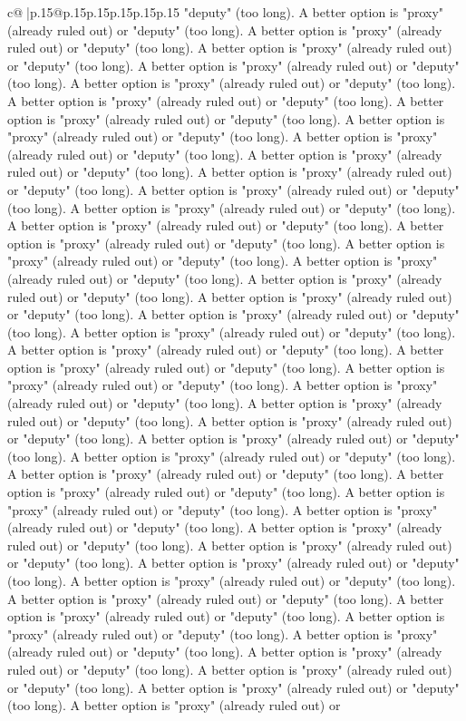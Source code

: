 \documentclass{article}
\begin{document}
{\begin{supertabular}{c@{$\;$}|p{.15\linewidth}@{}p{.15\linewidth}p{.15\linewidth}p{.15\linewidth}p{.15\linewidth}p{.15\linewidth}}
{{{"deputy" (too long). A better option is "proxy" (already ruled out) or "deputy" (too long). A better option is "proxy" (already ruled out) or "deputy" (too long). A better option is "proxy" (already ruled out) or "deputy" (too long). A better option is "proxy" (already ruled out) or "deputy" (too long). A better option is "proxy" (already ruled out) or "deputy" (too long). A better option is "proxy" (already ruled out) or "deputy" (too long). A better option is "proxy" (already ruled out) or "deputy" (too long). A better option is "proxy" (already ruled out) or "deputy" (too long). A better option is "proxy" (already ruled out) or "deputy" (too long). A better option is "proxy" (already ruled out) or "deputy" (too long). A better option is "proxy" (already ruled out) or "deputy" (too long). A better option is "proxy" (already ruled out) or "deputy" (too long). A better option is "proxy" (already ruled out) or "deputy" (too long). A better option is "proxy" (already ruled out) or "deputy" (too long). A better option is "proxy" (already ruled out) or "deputy" (too long). A better option is "proxy" (already ruled out) or "deputy" (too long). A better option is "proxy" (already ruled out) or "deputy" (too long). A better option is "proxy" (already ruled out) or "deputy" (too long). A better option is "proxy" (already ruled out) or "deputy" (too long). A better option is "proxy" (already ruled out) or "deputy" (too long). A better option is "proxy" (already ruled out) or "deputy" (too long). A better option is "proxy" (already ruled out) or "deputy" (too long). A better option is "proxy" (already ruled out) or "deputy" (too long). A better option is "proxy" (already ruled out) or "deputy" (too long). A better option is "proxy" (already ruled out) or "deputy" (too long). A better option is "proxy" (already ruled out) or "deputy" (too long). A better option is "proxy" (already ruled out) or "deputy" (too long). A better option is "proxy" (already ruled out) or "deputy" (too long). A better option is "proxy" (already ruled out) or "deputy" (too long). A better option is "proxy" (already ruled out) or "deputy" (too long). A better option is "proxy" (already ruled out) or "deputy" (too long). A better option is "proxy" (already ruled out) or "deputy" (too long). A better option is "proxy" (already ruled out) or "deputy" (too long). A better option is "proxy" (already ruled out) or "deputy" (too long). A better option is "proxy" (already ruled out) or "deputy" (too long). A better option is "proxy" (already ruled out) or "deputy" (too long). A better option is "proxy" (already ruled out) or "deputy" (too long). A better option is "proxy" (already ruled out) or "deputy" (too long). A better option is "proxy" (already ruled out) or "deputy" (too long). A better option is "proxy" (already ruled out) or "deputy" (too long). A better option is "proxy" (already ruled out) or "deputy" (too long). A better option is "proxy" (already ruled out) or "deputy" (too long). A better option is "proxy" (already ruled out) or "deputy" (too long). A better option is "proxy" (already ruled out) or "deputy" (too long). A better option is "proxy" (already ruled out) or }}}
\end{supertabular}}
\end{document}
